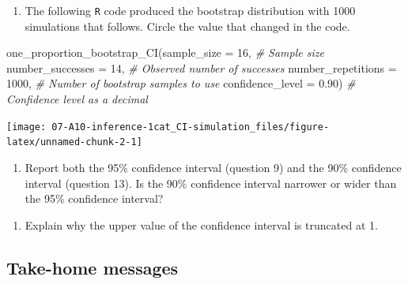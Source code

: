 \documentclass[
]{report}
\newenvironment{Shaded}{\begin{snugshade}}{\end{snugshade}}
\newcommand{\AttributeTok}[1]{\textcolor[rgb]{0.77,0.63,0.00}{#1}}
\newcommand{\CommentTok}[1]{\textcolor[rgb]{0.56,0.35,0.01}{\textit{#1}}}
\newcommand{\DecValTok}[1]{\textcolor[rgb]{0.00,0.00,0.81}{#1}}
\newcommand{\FloatTok}[1]{\textcolor[rgb]{0.00,0.00,0.81}{#1}}
\newcommand{\FunctionTok}[1]{\textcolor[rgb]{0.00,0.00,0.00}{#1}}
\newcommand{\NormalTok}[1]{#1}
\providecommand{\tightlist}{%
  \setlength{\itemsep}{0pt}\setlength{\parskip}{0pt}}
\begin{document}
\vspace{0.4in}

\begin{enumerate}
\def\labelenumi{\arabic{enumi}.}
\setcounter{enumi}{12}
\tightlist
\item
  The following \texttt{R} code produced the bootstrap distribution with 1000 simulations that follows. Circle the value that changed in the code.
\end{enumerate}

\begin{Shaded}
\begin{Highlighting}[]
\FunctionTok{one\_proportion\_bootstrap\_CI}\NormalTok{(}\AttributeTok{sample\_size =} \DecValTok{16}\NormalTok{, }\CommentTok{\# Sample size}
                    \AttributeTok{number\_successes =} \DecValTok{14}\NormalTok{, }\CommentTok{\# Observed number of successes}
                    \AttributeTok{number\_repetitions =} \DecValTok{1000}\NormalTok{, }\CommentTok{\# Number of bootstrap samples to use}
                    \AttributeTok{confidence\_level =} \FloatTok{0.90}\NormalTok{) }\CommentTok{\# Confidence level as a decimal}
\end{Highlighting}
\end{Shaded}

\begin{center}\texttt{[image: 07-A10-inference-1cat\_CI-simulation\_files/figure-latex/unnamed-chunk-2-1]} \end{center}

\begin{enumerate}
\def\labelenumi{\arabic{enumi}.}
\setcounter{enumi}{13}
\tightlist
\item
  Report both the 95\% confidence interval (question 9) and the 90\% confidence interval (question 13). Is the 90\% confidence interval narrower or wider than the 95\% confidence interval?
\end{enumerate}

\vspace{0.5in}

\begin{enumerate}
\def\labelenumi{\arabic{enumi}.}
\setcounter{enumi}{14}
\tightlist
\item
  Explain why the upper value of the confidence interval is truncated at 1.
\end{enumerate}

\vspace{0.5in}
\newpage

\hypertarget{take-home-messages-10}{%
\subsection{Take-home messages}\label{take-home-messages-10}}
\end{document}
